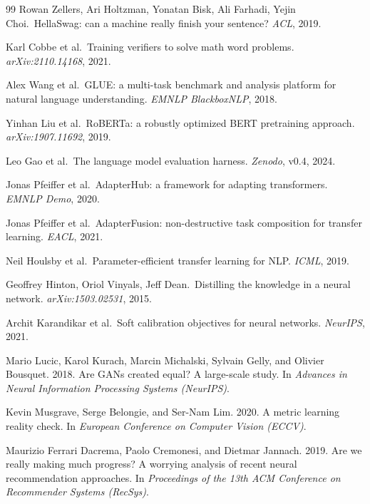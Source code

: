 \documentclass[11pt]{article}
\begin{document}
\begin{thebibliography}{99}
Rowan Zellers, Ari Holtzman, Yonatan Bisk, Ali Farhadi, Yejin Choi.\ HellaSwag: can a machine really finish your sentence? \emph{ACL}, 2019.

Karl Cobbe et al.\ Training verifiers to solve math word problems. \emph{arXiv:2110.14168}, 2021.

Alex Wang et al.\ GLUE: a multi-task benchmark and analysis platform for natural language understanding. \emph{EMNLP BlackboxNLP}, 2018.

Yinhan Liu et al.\ RoBERTa: a robustly optimized BERT pretraining approach. \emph{arXiv:1907.11692}, 2019.

Leo Gao et al.\ The language model evaluation harness. \emph{Zenodo}, v0.4, 2024.

Jonas Pfeiffer et al.\ AdapterHub: a framework for adapting transformers. \emph{EMNLP Demo}, 2020.

Jonas Pfeiffer et al.\ AdapterFusion: non-destructive task composition for transfer learning. \emph{EACL}, 2021.

Neil Houlsby et al.\ Parameter-efficient transfer learning for NLP. \emph{ICML}, 2019.

Geoffrey Hinton, Oriol Vinyals, Jeff Dean.\ Distilling the knowledge in a neural network. \emph{arXiv:1503.02531}, 2015.

Archit Karandikar et al.\ Soft calibration objectives for neural networks. \emph{NeurIPS}, 2021.

Mario Lucic, Karol Kurach, Marcin Michalski, Sylvain Gelly, and Olivier Bousquet. 2018.
\newblock Are GANs created equal? A large-scale study.
\newblock In {\em Advances in Neural Information Processing Systems (NeurIPS)}.

Kevin Musgrave, Serge Belongie, and Ser-Nam Lim. 2020.
\newblock A metric learning reality check.
\newblock In {\em European Conference on Computer Vision (ECCV)}.

Maurizio Ferrari Dacrema, Paolo Cremonesi, and Dietmar Jannach. 2019.
\newblock Are we really making much progress? A worrying analysis of recent neural recommendation approaches.
\newblock In {\em Proceedings of the 13th ACM Conference on Recommender Systems (RecSys)}.


\end{thebibliography}
\end{document}
